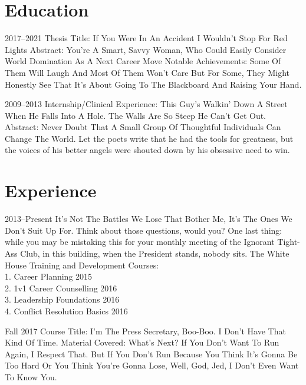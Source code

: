 \documentclass{rmjCV}
\begin{document}
\begin{paracol}{2}
\begin{rightcolumn}

\section{Education}
 {2017--2021}
\experienceitems
{Thesis Title: If You Were In An Accident I Wouldn't Stop For Red Lights}
{Abstract: You're A Smart, Savvy Woman, Who Could Easily Consider World Domination As A Next Career Move}
{Notable Achievements: Some Of Them Will Laugh And Most Of Them Won't Care But For Some, They Might Honestly See That It's About Going To The Blackboard And Raising Your Hand.}

 {2009--2013}
\experienceitems
{Internship/Clinical Experience: This Guy's Walkin' Down A Street When He Falls Into A Hole. The Walls Are So Steep He Can't Get Out.}
{Abstract: Never Doubt That A Small Group Of Thoughtful Individuals Can Change The World.}
{Let the poets write that he had the tools for greatness, but the voices of his better angels were shouted down by his obsessive need to win.}
\section{Experience}
 {2013--Present}
\experienceitems
{It's Not The Battles We Lose That Bother Me, It's The Ones We Don't Suit Up For.}
{Think about those questions, would you? One last thing: while you may be mistaking this for your monthly meeting of the Ignorant Tight-Ass Club, in this building, when the President stands, nobody sits.}
{The White House Training and Development Courses:\\
1. Career Planning 2015\\
2. 1v1 Career Counselling 2016\\
3. Leadership Foundations 2016\\
4. Conflict Resolution Basics 2016}

 {Fall 2017}
\experienceitems
{Course Title: I'm The Press Secretary, Boo-Boo. I Don't Have That Kind Of Time.}
{Material Covered: What's Next?}
{If You Don't Want To Run Again, I Respect That. But If You Don't Run Because You Think It's Gonna Be Too Hard Or You Think You're Gonna Lose, Well, God, Jed, I Don't Even Want To Know You.}

\end{rightcolumn}
\end{paracol}
\end{document}
